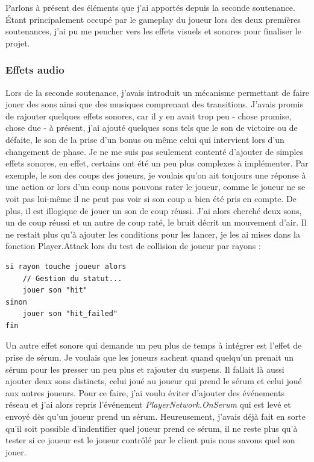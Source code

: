 \documentclass{article}
\begin{document}
Parlons à présent des éléments que j'ai apportés depuis la seconde soutenance.
Étant principalement occupé par le gameplay du joueur lors des deux premières soutenances, j'ai pu me pencher vers les effets visuels et sonores pour finaliser le projet.


\subsubsection{Effets audio}


Lors de la seconde soutenance, j'avais introduit un mécanisme permettant de faire jouer des sons ainsi que des musiques comprenant des transitions. J'avais promis de rajouter quelques effets sonores, car il y en avait trop peu - chose promise, chose due - à présent, j'ai ajouté quelques sons tels que le son de victoire ou de défaite, le son de la prise d'un bonus ou même celui qui intervient lors d'un changement de phase. Je ne me suis pas seulement contenté d'ajouter de simples effets sonores, en effet, certains ont été un peu plus complexes à implémenter. Par exemple, le son des coups des joueurs, je voulais qu'on ait toujours une réponse à une action or lors d'un coup nous pouvons rater le joueur, comme le joueur ne se voit pas lui-même il ne peut pas voir si son coup a bien été pris en compte. De plus, il est illogique de jouer un son de coup réussi. J'ai alors cherché deux sons, un de coup réussi et un autre de coup raté, le bruit décrit un mouvement d'air. Il ne restait plus qu'à ajouter les conditions pour les lancer, je les ai mises dans la fonction Player.Attack lors du test de collision de joueur par rayons :


\begin{lstlisting}
si rayon touche joueur alors
	// Gestion du statut...
	jouer son "hit"
sinon
	jouer son "hit_failed"
fin
\end{lstlisting}


Un autre effet sonore qui demande un peu plus de temps à intégrer est l'effet de prise de sérum. Je voulais que les joueurs sachent quand quelqu'un prenait un sérum pour les presser un peu plus et rajouter du suspens. Il fallait là aussi ajouter deux sons distincts, celui joué au joueur qui prend le sérum et celui joué aux autres joueurs. Pour ce faire, j'ai voulu éviter d'ajouter des événements réseau et j'ai alors repris l'événement \emph{PlayerNetwork.OnSerum} qui est levé et envoyé dès qu'un joueur prend un sérum. Heureusement, j'avais déjà fait en sorte qu'il soit possible d'indentifier quel joueur prend ce sérum, il ne reste plus qu'à tester si ce joueur est le joueur contrôlé par le client puis nous savons quel son jouer.
\end{document}

